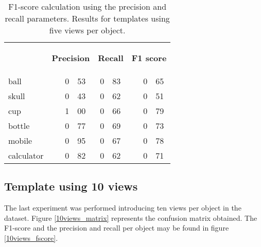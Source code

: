 \begin{table}[H]
\centering
\begin{tabular} {l l r@{.}l r@{.}l l r@{.}l }
\toprule
\addlinespace[3mm]
   \multicolumn{1}{c}{\begin{center}\textbf{Object}\end{center}} &
   \multicolumn{3}{c}{\begin{flushright}\textbf{Precision}\end{flushright}} &
   \multicolumn{2}{c}{\begin{flushright}\textbf{Recall}\end{flushright}} &
   \multicolumn{3}{c}{\begin{flushright}\hspace*{0.2cm}\textbf{F1 score}\end{flushright}} &\\
\addlinespace[-3mm]

\midrule
ball		&&	0&53 	&	0&83	&&	0&65	\\
skull		&&	0&43	&	0&62	&&	0&51	\\
cup			&&	1&00	&	0&66	&&	0&79	\\
bottle		&&	0&77	&	0&69	&&	0&73	\\
mobile		&&	0&95	&	0&67	&&	0&78	\\
calculator	&&	0&82	&	0&62	&&	0&71	\\


\bottomrule
\end{tabular}
\caption[F1-score - templates using 5 views]{F1-score calculation using the precision and recall parameters. Results for templates using five views per object. }
\label{5views_fscore}
\end{table}




\subsection{Template using 10 views}
The last experiment was performed introducing ten views per object in the dataset. 
Figure \ref{10views_matrix} represents the confusion matrix obtained. 
The F1-score and the precision and recall per object may be found in figure \ref{10views_fscore}.

